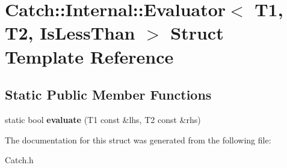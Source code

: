 \hypertarget{struct_catch_1_1_internal_1_1_evaluator_3_01_t1_00_01_t2_00_01_is_less_than_01_4}{\section{Catch\-:\-:Internal\-:\-:Evaluator$<$ T1, T2, Is\-Less\-Than $>$ Struct Template Reference}
\label{struct_catch_1_1_internal_1_1_evaluator_3_01_t1_00_01_t2_00_01_is_less_than_01_4}
}
\subsection*{Static Public Member Functions}
\begin{DoxyCompactItemize}
\item 
\hypertarget{struct_catch_1_1_internal_1_1_evaluator_3_01_t1_00_01_t2_00_01_is_less_than_01_4_a75b2bcf80ce6f90218c145e2c3293d75}{static bool {\bfseries evaluate} (T1 const \&lhs, T2 const \&rhs)}\label{struct_catch_1_1_internal_1_1_evaluator_3_01_t1_00_01_t2_00_01_is_less_than_01_4_a75b2bcf80ce6f90218c145e2c3293d75}

\end{DoxyCompactItemize}


The documentation for this struct was generated from the following file\-:\begin{DoxyCompactItemize}
\item 
Catch.\-h\end{DoxyCompactItemize}
